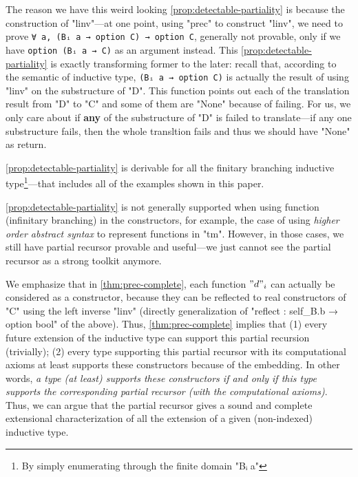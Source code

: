 The reason we have this weird looking \ref{prop:detectable-partiality} is because the construction of "linv"---at one point, using "prec" to construct "linv", we need to prove \texttt{∀ a, (Bᵢ a → option C) → option C}, generally not provable, only if we have \texttt{option (Bᵢ a → C)} as an argument instead. This \ref{prop:detectable-partiality} is exactly transforming former to the later: recall that, according to the semantic of inductive type, \texttt{(Bᵢ a → option C)} is actually the result of using "linv" on the substructure of "D". This function points out each of the translation result from "D" to "C" and some of them are "None" because of failing. For us, we only care about if \textbf{any} of the substructure of "D" is failed to translate---if any one substructure fails, then the whole transltion fails and thus we should have "None" as return. 

\ref{prop:detectable-partiality} is derivable for all the finitary branching inductive type\footnote{By simply enumerating through the finite domain "Bᵢ a"}---that includes all of the examples shown in this paper. 

\ref{prop:detectable-partiality} is not generally supported when using function (infinitary branching) in the constructors, for example, the case of using \textit{higher order abstract syntax} to represent functions in "tm". However, in those cases, we still have partial recursor provable and useful---we just cannot see the partial recursor as a strong toolkit anymore.


We emphasize that in \cref{thm:prec-complete}, each function $"d"_i$ can
actually be considered as a constructor, because they can be reflected
to real constructors of "C" using the left inverse "linv" (directly generalization of "reflect : self_B.b → option bool" of the above). Thus, \cref{thm:prec-complete}
implies that (1) every future extension of the inductive type can
support this partial recursion (trivially); (2) every type supporting
this partial recursor with its computational axioms at least supports
these constructors because of the embedding. In other words, \textit{a
type (at least) supports these constructors if and only if this type
supports the corresponding partial recursor (with the computational
axioms)}.  Thus, we can argue that the partial recursor gives a sound and
complete extensional characterization of all the extension of a given (non-indexed)
inductive type.

